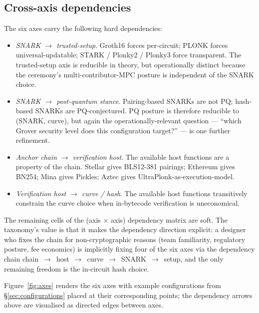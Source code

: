 \subsection{Cross-axis dependencies}
\label{sec:dimensions-deps}

The six axes carry the following hard dependencies:

\begin{itemize}
  \item \emph{SNARK $\to$ trusted-setup}. Groth16 forces per-circuit;
    PLONK forces universal-updatable; STARK / Plonky2 / Plonky3 force
    transparent. The trusted-setup axis is reducible in theory, but
    operationally distinct because the ceremony's
    multi-contributor-MPC posture is independent of the SNARK choice.
  \item \emph{SNARK $\to$ post-quantum stance}. Pairing-based SNARKs
    are not PQ; hash-based SNARKs are PQ-conjectured. PQ posture is
    therefore reducible to (SNARK, curve), but again the
    operationally-relevant question --- ``which Grover security level
    does this configuration target?'' --- is one further refinement.
  \item \emph{Anchor chain $\to$ verification host}. The available
    host functions are a property of the chain. Stellar gives
    BLS12-381 pairings; Ethereum gives BN254; Mina gives Pickles;
    Aztec gives UltraPlonk-as-execution-model.
  \item \emph{Verification host $\to$ curve / hash}. The available
    host functions transitively constrain the curve choice when
    in-bytecode verification is uneconomical.
\end{itemize}

The remaining cells of the (axis $\times$ axis) dependency matrix are
soft. The taxonomy's value is that it makes the dependency direction
explicit: a designer who fixes the chain for non-cryptographic reasons
(team familiarity, regulatory posture, fee economics) is implicitly
fixing four of the six axes via the dependency chain
chain~$\to$~host~$\to$~curve~$\to$~SNARK~$\to$~setup, and the only
remaining freedom is the in-circuit hash choice.

Figure~\ref{fig:axes} renders the six axes with example configurations
from \S\ref{sec:configurations} placed at their corresponding points;
the dependency arrows above are visualised as directed edges between
axes.



